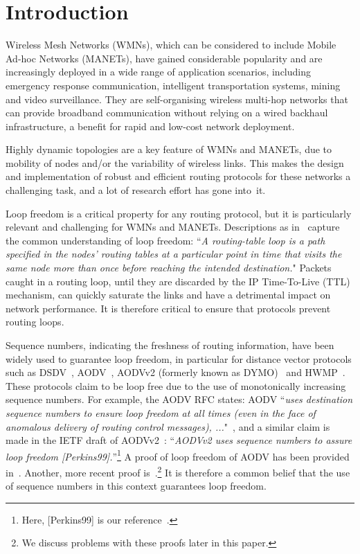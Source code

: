 \documentclass[letterpaper]{sig-alternate-pages}
\renewcommand{\sf}{\it}
\begin{document}
\section{Introduction}\label{sec:intro}
Wireless Mesh Networks (WMNs), which can be considered to include Mobile Ad-hoc Networks (MANETs),
have gained considerable popularity and are increasingly deployed in a wide range of application scenarios, including emergency response communication, intelligent transportation systems, mining and video surveillance. They are self-organising wireless multi-hop networks that can provide broadband communication without relying on a wired backhaul infrastructure, a benefit for rapid and low-cost network deployment. 

Highly dynamic topologies are a key feature of WMNs and MANETs,
due to mobility of nodes and/or the variability of wireless links. 
This makes the design and implementation of robust and efficient routing protocols for these networks a challenging task,
and a lot of research effort has gone into~it.

Loop freedom is a critical property for any routing protocol, but it is particularly relevant and challenging for WMNs and MANETs.
Descriptions as in~\cite{Garcia-Luna-Aceves89} capture the common understanding of loop freedom:
``{\sf A routing-table loop is a path specified in the nodes' routing tables at a particular point in time that visits the same node more than once before reaching the intended destination.}"
Packets caught in a routing loop,  until they are discarded by the IP Time-To-Live (TTL) mechanism, can quickly saturate the links and have a detrimental impact on network performance. It is therefore critical to ensure that protocols prevent routing loops.

Sequence numbers, indicating the freshness of routing information, have been widely used to guarantee loop freedom, in particular for distance vector protocols such as DSDV~\cite{DSDV94}, AODV~\cite{rfc3561}, AODVv2 (formerly known as DYMO)~\cite{DYMO25} and HWMP~\cite{HWMP}. 
These  protocols claim to be loop free due to the use of monotonically increasing sequence numbers.
For example, the AODV RFC states:  AODV ``{\sf uses destination sequence numbers to ensure loop freedom at all
 times (even in the face of anomalous delivery of routing control messages), ...}"~\cite{rfc3561}, 
and a similar claim is made in the IETF draft of AODVv2~\cite{DYMO25}:
``{\sf AODVv2 uses sequence numbers to assure loop freedom
  [Perkins99].\/}''\footnote{Here, [Perkins99]
is our reference~\cite{AODV99}.}
A proof of loop freedom of AODV has been provided in~\cite{AODV99}.  
Another, more recent proof is~\cite{ZYZW09}.\footnote{We discuss problems with these proofs later in this paper.}
It is therefore a common belief that the use of sequence numbers in this context guarantees loop freedom. 
\end{document}
